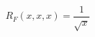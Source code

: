 \documentclass[12pt]{article}
\begin{document}
\begin{displaymath}
R_F(x, x, x) = \frac{1}{\sqrt{x}}
\end{displaymath}
\end{document}
